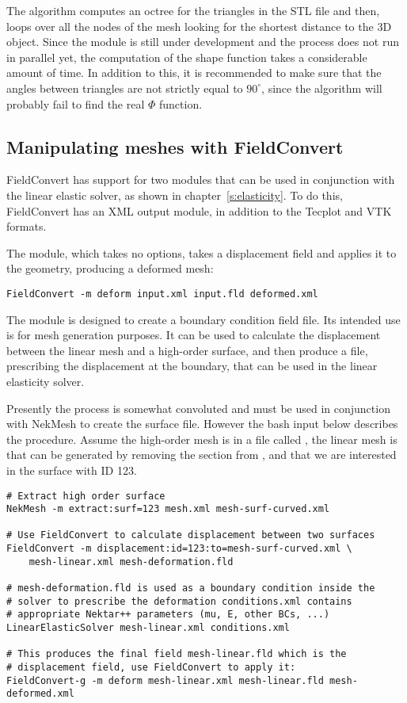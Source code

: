 The algorithm computes an octree for the triangles in the STL file and then,
loops over all the nodes of the mesh looking for the shortest distance to the
3D object. Since the module is still under development and the process does
not run in parallel yet, the computation of the shape function takes a
considerable amount of time. In addition to this, it is recommended to make
sure that the angles between triangles are not strictly equal to $90^\circ$,
since the algorithm will probably fail to find the real $\Phi$ function.
%
%
%

\subsection{Manipulating meshes with FieldConvert}
FieldConvert has support for two modules that can be used in conjunction with
the linear elastic solver, as shown in chapter~\ref{s:elasticity}. To do this,
FieldConvert has an XML output module, in addition to the Tecplot and VTK
formats.

The  module, which takes no options, takes a displacement field
and applies it to the geometry, producing a deformed mesh:
\begin{lstlisting}[style=BashInputStyle]
FieldConvert -m deform input.xml input.fld deformed.xml
\end{lstlisting}

The  module is designed to create a boundary condition field
file. Its intended use is for mesh generation purposes. It can be used to
calculate the displacement between the linear mesh and a high-order surface, and
then produce a  file, prescribing the displacement at the boundary,
that can be used in the linear elasticity solver.

Presently the process is somewhat convoluted and must be used in conjunction
with NekMesh to create the surface file. However the bash input below
describes the procedure. Assume the high-order mesh is in a file called
, the linear mesh is  that can be
generated by removing the  section from , and that
we are interested in the surface with ID 123.

\begin{lstlisting}[style=BashInputStyle]
# Extract high order surface
NekMesh -m extract:surf=123 mesh.xml mesh-surf-curved.xml

# Use FieldConvert to calculate displacement between two surfaces
FieldConvert -m displacement:id=123:to=mesh-surf-curved.xml \
    mesh-linear.xml mesh-deformation.fld

# mesh-deformation.fld is used as a boundary condition inside the
# solver to prescribe the deformation conditions.xml contains
# appropriate Nektar++ parameters (mu, E, other BCs, ...)
LinearElasticSolver mesh-linear.xml conditions.xml

# This produces the final field mesh-linear.fld which is the
# displacement field, use FieldConvert to apply it:
FieldConvert-g -m deform mesh-linear.xml mesh-linear.fld mesh-deformed.xml
\end{lstlisting}

